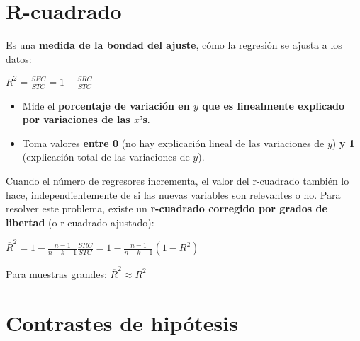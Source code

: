 \documentclass[10pt, a4paper, landscape]{extarticle}
\begin{document}
\begin{multicols}{3}
\section*{R-cuadrado}
	Es una \textbf{medida de la bondad del ajuste}, cómo la regresión se ajusta a los datos:
	\begin{center}
		$R^2 = \frac{SEC}{STC} = 1 - \frac{SRC}{STC}$
	\end{center}
	\begin{itemize}[leftmargin=*]
		\item Mide el \textbf{porcentaje de variación en $y$ que es linealmente explicado por variaciones de las $x$'s}.
		\item Toma valores \textbf{entre 0} (no hay explicación lineal de las variaciones de $y$) \textbf{y 1} (explicación total de las variaciones de $y$).
	\end{itemize}
	Cuando el número de regresores incrementa, el valor del r-cuadrado también lo hace, independientemente de si las nuevas variables son relevantes o no. Para resolver este problema, existe un \textbf{r-cuadrado corregido por grados de libertad} (o r-cuadrado ajustado):
	\begin{center}
		$\overline{R}^2 = 1 - \frac{n-1}{n-k-1} \frac{SRC}{STC} = 1 - \frac{n-1}{n-k-1} (1-R^2)$
	\end{center}
	Para muestras grandes: $\overline{R}^2 \approx R^2$

\section*{Contrastes de hipótesis}

\end{multicols}
\end{document}
